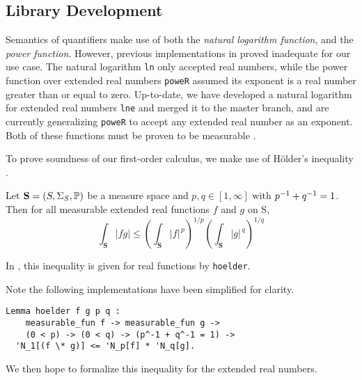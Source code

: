 \documentclass[sigplan, screen, review, nonacm]{acmart}
\begin{document}
\subsection{Library Development}

Semantics of quantifiers make use of both the \textit{natural logarithm function}, and the \textit{power function}. However, previous implementations in \mathcomp{} proved inadequate for our use case. The natural logarithm \texttt{ln} only accepted real numbers, while the power function over extended real numbers \texttt{poweR} assumed its exponent is a real number greater than or equal to zero. Up-to-date, we have developed a natural logarithm for extended real numbers \texttt{lne} and merged it to the master branch, and are currently generalizing \texttt{poweR} to accept any extended real number as an exponent. Both of these functions must be proven to be measurable \citep{mitrinovic1970analytic}.  

To prove soundness of our first-order calculus, we make use of Hölder's inequality \cite{mitrinovic1970analytic}.


\begin{definition}
    Let $\textbf{S} = (S, \Sigma_{S}, \mathbb{P})$ be a measure space and $p,q \in [1,\infty]$ with $p ^{-1} + q ^{-1} = 1$. Then for all measurable extended real functions $f$ and $g$ on S,
    \begin{equation*}
         \int_{\textbf{S}} |fg| \leq \left(\int_{\textbf{S}} |f|^{\,p}\right)^{1/p}\left(\int_{\textbf{S}} |g|^{\,q}\right)^{1/q}
    \end{equation*}
\end{definition}

In \mathcomp{}, this inequality is given for real functions by \texttt{hoelder}. 

Note the following implementations have been simplified for clarity. 

\begin{verbatim}
Lemma hoelder f g p q :
    measurable_fun f -> measurable_fun g ->
    (0 < p) -> (0 < q) -> (p^-1 + q^-1 = 1) ->
  'N_1[(f \* g)] <= 'N_p[f] * 'N_q[g].
\end{verbatim}

We then hope to formalize this inequality for the extended real numbers. 
\end{document}
